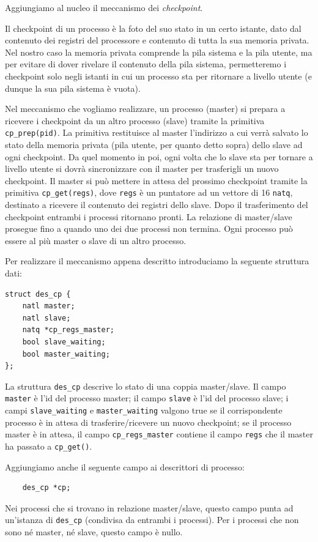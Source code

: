 Aggiungiamo al nucleo il meccanismo dei {\em checkpoint}.

Il checkpoint di un processo \`e la foto del suo stato in un certo istante, dato dal
contenuto dei registri del processore e contenuto di tutta la sua memoria privata.
Nel nostro caso la memoria privata comprende la pila sistema e la pila utente, ma
per evitare di dover rivelare il contenuto della pila sistema, permetteremo i checkpoint
solo negli istanti in cui un processo sta per ritornare a livello utente (e dunque la
sua pila sistema \`e vuota).

Nel meccanismo che vogliamo realizzare, un processo (master) si prepara a ricevere
i checkpoint da un altro processo (slave) tramite la primitiva \verb|cp_prep(pid)|.
La primitiva restituisce al master l'indirizzo a cui verr\`a salvato lo stato della
memoria privata (pila utente, per quanto detto sopra) dello slave ad ogni checkpoint.
Da quel momento in poi, ogni volta che lo slave sta per tornare a livello utente si
dovr\`a sincronizzare con il master per trasferigli un nuovo checkpoint. Il master
si pu\`o mettere in attesa del prossimo checkpoint tramite la primitiva \verb|cp_get(regs)|,
dove \verb|regs| \`e un puntatore ad un vettore di 16 \verb|natq|, destinato a ricevere
il contenuto dei registri dello slave. Dopo il trasferimento del checkpoint entrambi i
processi ritornano pronti. La relazione di master/slave prosegue fino a quando uno dei
due processi non termina. Ogni processo pu\`o essere al pi\`u master o slave di un altro processo.

Per realizzare il meccanismo appena descritto introduciamo la seguente struttura dati:
\begin{verbatim}
struct des_cp {
    natl master;
    natl slave;
    natq *cp_regs_master;
    bool slave_waiting;
    bool master_waiting;
};
\end{verbatim}
La struttura \verb|des_cp| descrive lo stato di una coppia master/slave.
Il campo \verb|master| \`e l'id del processo master;
il campo \verb|slave| \`e l'id del processo slave;
i campi \verb|slave_waiting| e \verb|master_waiting| valgono true se il corrispondente processo
\`e in attesa di trasferire/ricevere un nuovo checkpoint;
se il processo master \`e in attesa, il campo \verb|cp_regs_master| contiene il campo \verb|regs|
che il master ha passato a \verb|cp_get()|.

Aggiungiamo anche il seguente campo ai descrittori di processo:
\begin{verbatim}
    des_cp *cp;
\end{verbatim}
Nei processi che si trovano in relazione master/slave, questo campo punta ad un'istanza
di \verb|des_cp| (condivisa da entrambi i processi). Per i processi che non sono n\'e master,
n\'e slave, questo campo \`e nullo.

